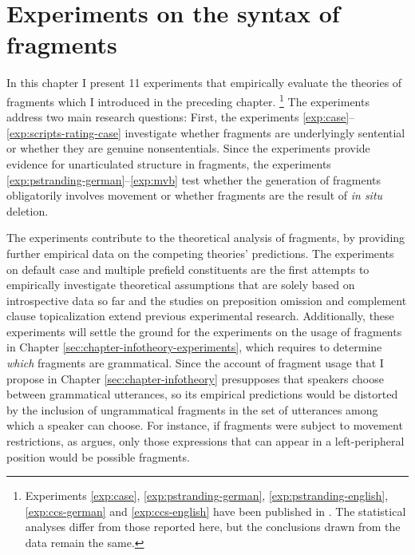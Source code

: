 \chapter[Experiments on the syntax of fragments]{Experiments on the syntax of fragments} \label{sec:chapter-experiments-syntax} 

In this chapter I present 11 experiments that empirically evaluate the theories of fragments which I introduced in the preceding chapter.%
%
\footnote{Experiments \ref{exp:case}, \ref{exp:pstranding-german}, \ref{exp:pstranding-english}, \ref{exp:ccs-german} and \ref{exp:ccs-english} have been published in \citet{lemke2017}. The statistical analyses differ from those reported here, but the conclusions drawn from the data remain the same.}\afterfn%
%
The experiments address two main research questions: First, the experiments \ref{exp:case}--\ref{exp:scripts-rating-case} investigate whether fragments are underlyingly sentential or whether they are genuine nonsententials. Since the experiments provide evidence for unarticulated structure in fragments, the experiments \ref{exp:pstranding-german}--\ref{exp:mvb} test whether the generation of fragments obligatorily involves movement or whether fragments are the result of \textit{in situ} deletion. 

The experiments contribute to the theoretical analysis of fragments, by providing further empirical data on the competing theories' predictions. The experiments on default case and multiple prefield constituents are the first attempts to empirically investigate theoretical assumptions that are solely based on introspective data so far and the studies on preposition omission and complement clause topicalization extend previous experimental research. Additionally, these experiments will settle the ground for the experiments on the usage of fragments in Chapter \ref{sec:chapter-infotheory-experiments}, which requires to determine \textit{which} fragments are grammatical. Since the account of fragment usage that I propose in Chapter \ref{sec:chapter-infotheory} presupposes that speakers choose between grammatical utterances, so its empirical predictions would be distorted by the inclusion of ungrammatical fragments in the set of utterances among which a speaker can choose. For instance, if fragments were subject to movement restrictions, as \citet{merchant2004} argues, only those expressions that can appear in a left-peripheral position would be possible fragments.

